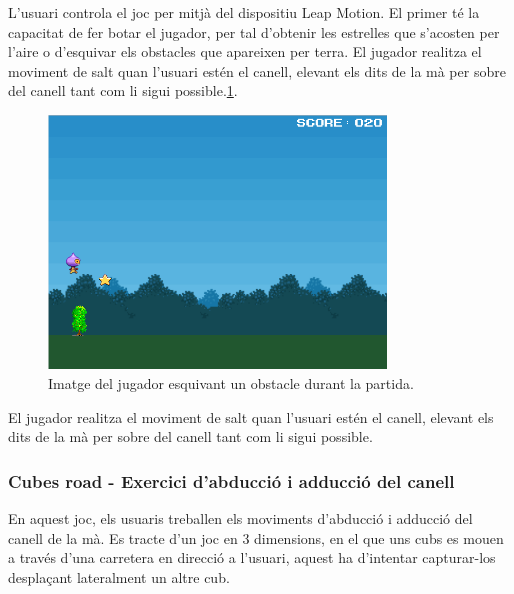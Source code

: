 \documentclass[12pt,a4paper,catalan]{article}
\begin{document}
	L'usuari controla el joc per mitjà del dispositiu Leap Motion. El primer té la capacitat de fer botar el jugador, per tal d'obtenir les estrelles que s'acosten per l'aire o d'esquivar els obstacles que apareixen per terra. El jugador realitza el moviment de salt quan l'usuari estén el canell, elevant els dits de la mà per sobre del canell tant com li sigui possible.\ref{fig:runnerboy-obstacle}.
	\begin{figure}[H]
		\includegraphics[width=0.8\textwidth,keepaspectratio]{runner-boy-obstacle.png}
		\centering
		\caption{Imatge del jugador esquivant un obstacle durant la partida.}
		\label{fig:runnerboy-obstacle}
	\end{figure}
	El jugador realitza el moviment de salt quan l'usuari estén el canell, elevant els dits de la mà per sobre del canell tant com li sigui possible.
	\subsubsection{Cubes road - Exercici d'abducció i adducció del canell}
	En aquest joc, els usuaris treballen els moviments d'abducció i adducció del canell de la mà. Es tracte d'un joc en 3 dimensions, en el que uns cubs es mouen a través d'una carretera en direcció a l'usuari, aquest ha d'intentar capturar-los desplaçant lateralment un altre cub.
	
\end{document}
